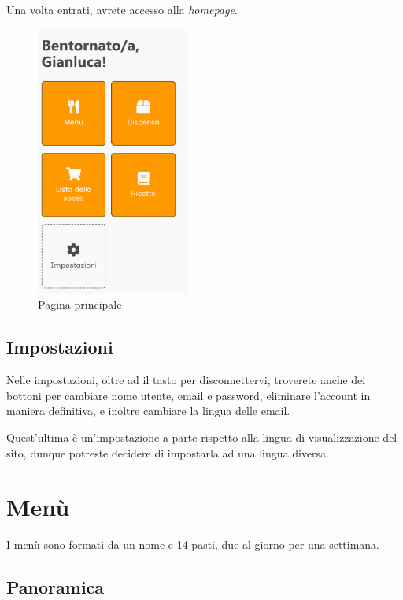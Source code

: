 \documentclass[12pt, a4paper]{report}
\begin{document}
    Una volta entrati, avrete accesso alla \emph{homepage}.

    \begin{figure}[H]
        \centering
        \includegraphics[width=0.45\textwidth]{assets/it/home.png}
        \caption{Pagina principale}
    \end{figure}

    \section{Impostazioni}

    Nelle impostazioni, oltre ad il tasto per disconnettervi, troverete anche dei bottoni per cambiare nome utente, email e password, eliminare
    l'account in maniera definitiva, e inoltre cambiare la lingua delle email. 

    Quest'ultima è un'impostazione a parte rispetto alla lingua di visualizzazione del sito, dunque potreste decidere di impostarla ad una lingua
    diversa.



    \chapter{Menù}

    I menù sono formati da un nome e 14 pasti, due al giorno per una settimana.

    \section{Panoramica}
\end{document}

